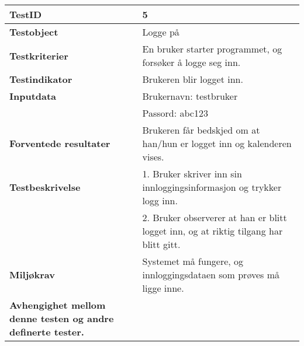 	\begin{tabularx}{1.2\textwidth}{| p{5cm} | X |}
	\hline
	\textbf{TestID} 																& 5																	\\ \hline
	\textbf{Testobject} 															& Logge på															\\ \hline
	\textbf{Testkriterier} 															& En bruker starter programmet, og forsøker å logge seg inn.							\\ \hline
	\textbf{Testindikator} 															& Brukeren blir logget inn.													\\ \hline
	\textbf{Inputdata} 															& Brukernavn: testbruker													\\ 
																			& Passord: abc123														\\  \hline
	\textbf{Forventede resultater}									 				& Brukeren får bedskjed om at han/hun er logget inn og kalenderen vises.				\\ \hline
	\textbf{Testbeskrivelse} 														& 1. Bruker skriver inn sin innloggingsinformasjon og trykker logg inn.					\\
																			& 2. Bruker observerer at han er blitt logget inn, og at riktig tilgang har blitt gitt.					\\ \hline
	\textbf{Miljøkrav}			 												& Systemet må fungere, og innloggingsdataen som prøves må ligge inne.						\\ \hline
	\textbf{Avhengighet mellom denne testen og andre definerte tester.}		 				&				 													\\ \hline
	\end{tabularx}

\mbox{}\\

